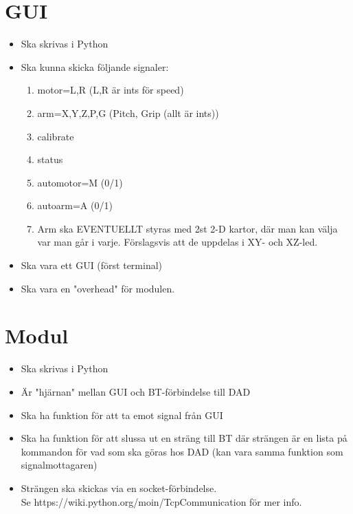%
	\section{GUI}
	\begin{itemize}
		\item Ska skrivas i Python
		\item Ska kunna skicka följande signaler:
		\begin{enumerate}
			\item motor=L,R (L,R är ints för speed)
			\item arm=X,Y,Z,P,G (Pitch, Grip (allt är ints))
			\item calibrate
			\item status
			\item automotor=M (0/1)
			\item autoarm=A (0/1)
			\item Arm ska EVENTUELLT styras med 2st 2-D kartor, där man kan välja var man går i varje. Förslagsvis att de uppdelas i XY- och XZ-led.
		\end{enumerate}
		\item Ska vara ett GUI (först terminal)
		\item Ska vara en "overhead" för modulen.
		
	\end{itemize}
	\pagebreak
	
	\section{Modul}
	\begin{itemize}
		\item Ska skrivas i Python
		\item Är "hjärnan" mellan GUI och BT-förbindelse till DAD
		\item Ska ha funktion för att ta emot signal från GUI
		\item Ska ha funktion för att slussa ut en sträng till BT där strängen är en lista på kommandon för vad som ska göras hos DAD (kan vara samma funktion som signalmottagaren)
		\item Strängen ska skickas via en socket-förbindelse. \\
		Se https://wiki.python.org/moin/TcpCommunication för mer info.
	\end{itemize}
	\pagebreak

